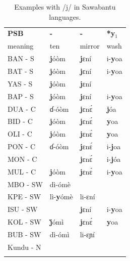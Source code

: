 \documentclass[output=paper,colorlinks,citecolor=brown
]{langscibook}
\begin{document}
\begin{table}
\caption{Examples with /j/ in Sawabantu languages.}
\label{tab:grollemundbrownrule:jexamples}
 \begin{tabular}{llll}
  \lsptoprule
\textbf{PSB}              & \textbf{-}            & \textbf{-}               & \textbf{*y$_1$}           \\
 {{meaning}} & {{ten}} & {{mirror}} & {{wash}} \\
\midrule
BAN - S                   & \textbf{j}óòm                & \textbf{j}ɛní                    & i-\textbf{y}oa                  \\
BAT - S                   & \textbf{j}óòm                & \textbf{j}ɛní                    & i-\textbf{y}oa                  \\
YAS - S                   & \textbf{j}óòm                & \textbf{j}ɛní                    &                        \\
BAP - S                   & \textbf{j}óòm                & \textbf{j}ɛní                    & i-\textbf{y}oa                  \\
DUA - C                   & ɗ-óòm               & \textbf{j}ɛnɛ́                    & \textbf{j}óa                   \\
BID - C                   & \textbf{j}óòm                & \textbf{j}ɛnɛ́                    & \textbf{y}oa                    \\
OLI - C                   & \textbf{j}óòm                & \textbf{j}ɛnɛ́                    & \textbf{y}oa                    \\
PON - C                   & ɗ-óòm               & \textbf{j}ɛnɛ́                    & i-\textbf{j}oa                  \\
MON - C                   &                       & \textbf{j}ɛnɛ́                    & i-\textbf{j}óa                 \\
MUL - C                   & \textbf{j}óòm                & \textbf{j}ɛnɛ́                    & i-\textbf{y}oa                  \\
MBO - SW                  & dì-ómè             &                          &                        \\
KPE - SW                  & lì-\textbf{y}ómè            & li-ɛní                  &                        \\
ISU - SW                  &                       & \textbf{j}ɛní                    & i-\textbf{y}oa                  \\
KOL - SW                  & \textbf{j̀}ómì               & \textbf{j}ɛnɛ́                    & \textbf{y}oa                    \\
BUB - SW                  & dì-ómì             & li-ɛɲí                  &                        \\
Kundu - N                 &                       &                          &    \\
   \lspbottomrule
 \end{tabular}
\end{table}
\end{document}
